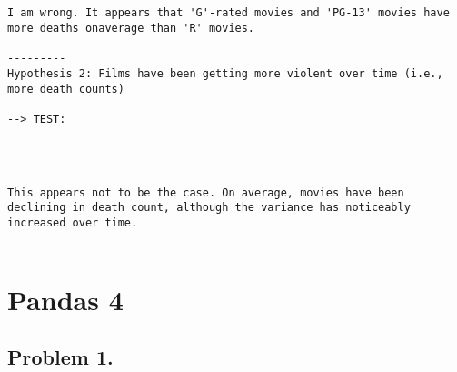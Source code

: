 \documentclass[11pt]{article}
\begin{document}
    \begin{center}
    \end{center}
    { \hspace*{\fill} \\}
    
    \begin{Verbatim}[commandchars=\\\{\}]

I am wrong. It appears that 'G'-rated movies and 'PG-13' movies have more deaths onaverage than 'R' movies.

---------
Hypothesis 2: Films have been getting more violent over time (i.e., more death counts)

--> TEST:

    \end{Verbatim}

    \begin{center}
    \end{center}
    { \hspace*{\fill} \\}
    
    \begin{Verbatim}[commandchars=\\\{\}]

This appears not to be the case. On average, movies have been declining in death count, although the variance has noticeably increased over time.


    \end{Verbatim}

    \section{Pandas 4}\label{pandas-4}

    \subsection*{Problem 1.}\label{problem-1.}
\end{document}
